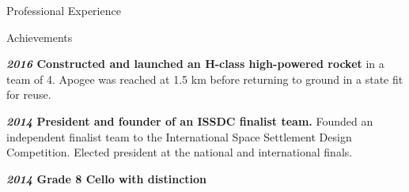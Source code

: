 \documentclass[10pt]{resume} %
\begin{document}
\begin{rSection}{Professional Experience}




\end{rSection}


\begin{rSection}{Achievements}
    \item \textbf{\textit{2016} Constructed and launched an H-class high-powered rocket} in a team of 4. Apogee was reached at 1.5 km before returning to ground in a state fit for reuse.
    \item \textbf{\textit{2014} President and founder of an ISSDC finalist team.} Founded an independent finalist team to the International Space Settlement Design Competition. Elected president at the national and international finals.
    \item \textbf{\textit{2014} Grade 8 Cello with distinction}
\end{rSection}
\end{document}
